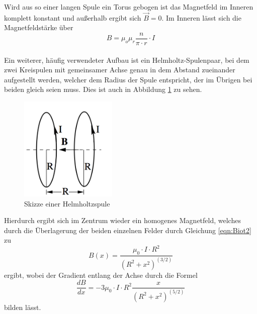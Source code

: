 \noindent Wird aus so einer langen Spule ein Torus gebogen ist das Magnetfeld im
Inneren komplett konstant und außerhalb ergibt sich $ \vec{B} = 0$. Im Inneren
lässt sich die Magnetfeldstärke über
\begin{equation}
    B= \mu_o \mu_r \frac{n}{\pi \cdot r} \cdot I
    \label{eqn:torus}
  \end{equation} \\

  \noindent Ein weiterer, häufig verwendeter Aufbau ist ein Helmholtz-Spulenpaar,
  bei dem zwei Kreispulen mit gemeinsamer Achse genau in dem Abstand zueinander
  aufgestellt werden, welcher dem Radius der Spule entspricht, der im Übrigen
  bei beiden gleich seien muss. Dies ist auch in Abbildung \ref{fig:helm} zu sehen.
  \begin{figure}[H]
    \centering
    \includegraphics[height=5cm]{Helmholtz.png}
    \caption{Skizze einer Helmholtzspule \cite{skript}}
    \label{fig:helm}
  \end{figure}

  \noindent Hierdurch ergibt sich im Zentrum wieder ein homogenes
  Magnetfeld, welches durch die Überlagerung der beiden einzelnen Felder durch Gleichung
  \ref{eqn:Biot2} zu
  \begin{equation}
    B(x)= \frac{\mu_0 \cdot I \cdot R^2}{(R^2 + x^2)^(3/2)}
    \label{eqn:Helmholtz}
  \end{equation}
  ergibt, wobei der Gradient entlang der Achse durch die Formel
  \begin{equation}
    \frac{dB}{dx} = -3\mu_0 \cdot I \cdot R^2 \frac{x}{(R^2+x^2)^(5/2)}
    \label{eqn:gradient}
  \end{equation}
bilden lässt. \\

